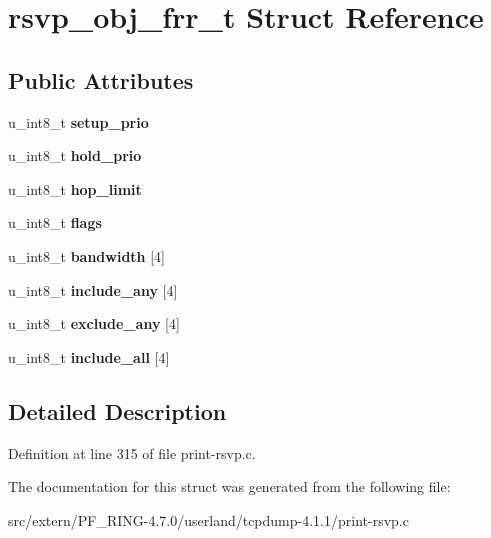 \hypertarget{structrsvp__obj__frr__t}{
\section{rsvp\_\-obj\_\-frr\_\-t Struct Reference}
\label{structrsvp__obj__frr__t}
}
\subsection*{Public Attributes}
\begin{DoxyCompactItemize}
\item 
\hypertarget{structrsvp__obj__frr__t_a47e600e8caecfbdff098b848bea215b2}{
u\_\-int8\_\-t {\bfseries setup\_\-prio}}
\label{structrsvp__obj__frr__t_a47e600e8caecfbdff098b848bea215b2}

\item 
\hypertarget{structrsvp__obj__frr__t_a458c5b55184c3dae6d4bc3933c534085}{
u\_\-int8\_\-t {\bfseries hold\_\-prio}}
\label{structrsvp__obj__frr__t_a458c5b55184c3dae6d4bc3933c534085}

\item 
\hypertarget{structrsvp__obj__frr__t_aae214a0972969f81609c6f340674046d}{
u\_\-int8\_\-t {\bfseries hop\_\-limit}}
\label{structrsvp__obj__frr__t_aae214a0972969f81609c6f340674046d}

\item 
\hypertarget{structrsvp__obj__frr__t_adec29895f4e2a9192c31dc35a378c392}{
u\_\-int8\_\-t {\bfseries flags}}
\label{structrsvp__obj__frr__t_adec29895f4e2a9192c31dc35a378c392}

\item 
\hypertarget{structrsvp__obj__frr__t_afec8273a2cb7a7d8d93095070d00b61a}{
u\_\-int8\_\-t {\bfseries bandwidth} \mbox{[}4\mbox{]}}
\label{structrsvp__obj__frr__t_afec8273a2cb7a7d8d93095070d00b61a}

\item 
\hypertarget{structrsvp__obj__frr__t_ae2d492d1cb7b2be4d5d21aa9c029a9b9}{
u\_\-int8\_\-t {\bfseries include\_\-any} \mbox{[}4\mbox{]}}
\label{structrsvp__obj__frr__t_ae2d492d1cb7b2be4d5d21aa9c029a9b9}

\item 
\hypertarget{structrsvp__obj__frr__t_af6092e2e830d35b78658c13e12f2be64}{
u\_\-int8\_\-t {\bfseries exclude\_\-any} \mbox{[}4\mbox{]}}
\label{structrsvp__obj__frr__t_af6092e2e830d35b78658c13e12f2be64}

\item 
\hypertarget{structrsvp__obj__frr__t_a44975b00a4917c044833e15ec1e91da1}{
u\_\-int8\_\-t {\bfseries include\_\-all} \mbox{[}4\mbox{]}}
\label{structrsvp__obj__frr__t_a44975b00a4917c044833e15ec1e91da1}

\end{DoxyCompactItemize}


\subsection{Detailed Description}


Definition at line 315 of file print-\/rsvp.c.



The documentation for this struct was generated from the following file:\begin{DoxyCompactItemize}
\item 
src/extern/PF\_\-RING-\/4.7.0/userland/tcpdump-\/4.1.1/print-\/rsvp.c\end{DoxyCompactItemize}
